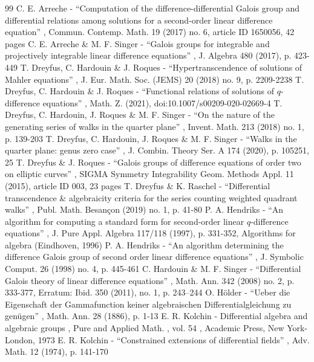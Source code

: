 \begin{thebibliography}{99}
 C. E. Arreche - “Computation of the difference-differential Galois group and differential relations among solutions for a second-order linear difference equation” , Commun. Contemp. Math. 19 (2017) no. 6, article ID 1650056, 42 pages
 C. E. Arreche \& M. F. Singer - “Galois groups for integrable and projectively integrable linear difference equations” , J. Algebra 480 (2017), p. 423-449
 T. Dreyfus, C. Hardouin \& J. Roques - “Hypertranscendence of solutions of Mahler equations” , J. Eur. Math. Soc. (JEMS) 20 (2018) no. 9, p. 2209-2238
 T. Dreyfus, C. Hardouin \& J. Roques - “Functional relations of solutions of $ q $-difference equations” , Math. Z. (2021), doi:10.1007/s00209-020-02669-4
 T. Dreyfus, C. Hardouin, J. Roques \& M. F. Singer - “On the nature of the generating series of walks in the quarter plane” , Invent. Math. 213 (2018) no. 1, p. 139-203
 T. Dreyfus, C. Hardouin, J. Roques \& M. F. Singer - “Walks in the quarter plane: genus zero case” , J. Combin. Theory Ser. A 174 (2020), p. 105251, 25
 T. Dreyfus \& J. Roques - “Galois groups of difference equations of order two on elliptic curves” , SIGMA Symmetry Integrability Geom. Methods Appl. 11 (2015), article ID 003, 23 pages
 T. Dreyfus \& K. Raschel - “Differential transcendence \& algebraicity criteria for the series counting weighted quadrant walks” , Publ. Math. Besançon (2019) no. 1, p. 41-80
 P. A. Hendriks - “An algorithm for computing a standard form for second-order linear $q$-difference equations” , J. Pure Appl. Algebra 117/118 (1997), p. 331-352, Algorithms for algebra (Eindhoven, 1996)
 P. A. Hendriks - “An algorithm determining the difference Galois group of second order linear difference equations” , J. Symbolic Comput. 26 (1998) no. 4, p. 445-461
 C. Hardouin \& M. F. Singer - “Differential Galois theory of linear difference equations” , Math. Ann. 342 (2008) no. 2, p. 333-377, Erratum: Ibid. 350 (2011), no. 1, p. 243–244
 O. Hölder - “Ueber die Eigenschaft der Gammafunction keiner algebraischen Differentialgleichung zu genügen” , Math. Ann. 28 (1886), p. 1-13
 E. R. Kolchin - Differential algebra and algebraic groups , Pure and Applied Math. , vol. 54 , Academic Press, New York-London, 1973
 E. R. Kolchin - “Constrained extensions of differential fields” , Adv. Math. 12 (1974), p. 141-170

\end{thebibliography}
